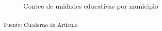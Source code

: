 \documentclass[
  12pt]{article}
\begin{document}
\begin{figure}[H]


\caption{\label{fig-mun2024}Conteo de unidades educativas por municipio}

\end{figure}%

\textsubscript{Fuente:
\href{https://sociest.github.io/ue-report/index.ipynb.html}{Cuaderno de
Artículo}}
\end{document}
